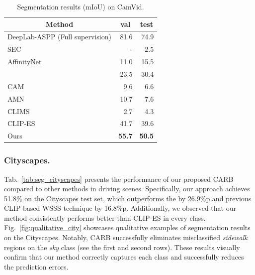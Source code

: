 \documentclass[letterpaper]{article} %
\begin{document}
\begin{table}[]
\normalsize
\centering
{\small
\begin{tabular}{@{}lrr@{}}
\toprule
\multicolumn{1}{c}{Method}          & \multicolumn{1}{c}{val}   & \multicolumn{1}{c}{test} \\ \midrule
\multicolumn{1}{l}{DeepLab-ASPP (Full supervision)}     & 81.6                      & \multicolumn{1}{r}{74.9}              \\ \midrule
\multicolumn{1}{l}{SEC} & - &  \multicolumn{1}{r}{2.5}              \\
\multicolumn{1}{l}{AffinityNet} & 11.0 & \multicolumn{1}{r}{15.5} \\
\multicolumn{1}{l}{\citeauthor{wang2020deep}} & 23.5 & \multicolumn{1}{r}{30.4} \\
\multicolumn{1}{l}{CAM} & 9.6 & \multicolumn{1}{r}{6.6} \\
\multicolumn{1}{l}{AMN} & 10.7 & \multicolumn{1}{r}{7.6} \\
\multicolumn{1}{l}{CLIMS} & 2.7 & \multicolumn{1}{r}{4.3} \\
\multicolumn{1}{l}{CLIP-ES} & 41.7 & \multicolumn{1}{r}{39.6} \\ \midrule
\multicolumn{1}{l}{Ours} & \textbf{55.7} & \multicolumn{1}{r}{\textbf{50.5}} \\ \bottomrule
\end{tabular}
}

\caption{Segmentation results (mIoU) on CamVid.}
\label{tab:seg_camvid}
\end{table}

\subsubsection{Cityscapes.} Tab.~\ref{tab:seg_cityscapes} presents the performance of our proposed CARB compared to other methods in driving scenes. Specifically, our approach achieves 51.8\% on the Cityscapes test set, which outperforms the \citeauthor{wang2020deep} by 26.9\%p and
previous CLIP-based WSSS technique by 16.8\%p. Additionally, we observed that our method consistently performs better than CLIP-ES in every class. Fig.~\ref{fig:qualitative_city} showcases qualitative examples of segmentation results on the Cityscapes. Notably, CARB successfully eliminates misclassified \textit{sidewalk} regions on the \textit{sky} class (see the first and second rows). These results visually confirm that our method correctly captures each class and successfully reduces the prediction errors.
\end{document}
